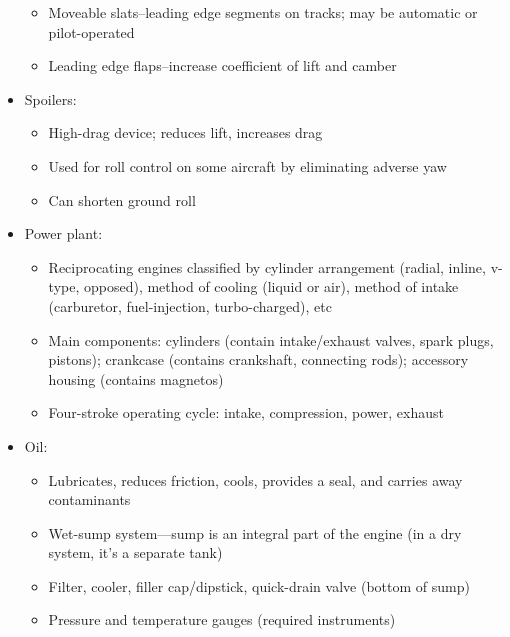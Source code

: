 \documentclass[twoside,openright]{report}
\begin{document}
\begin{itemize}
\begin{itemize}
      \item Moveable slats--leading edge segments on tracks; may be automatic or pilot-operated

      \item Leading edge flaps--increase coefficient of lift and camber
    \end{itemize}

  \item Spoilers:
    \begin{itemize}
      \item High-drag device; reduces lift, increases drag

      \item Used for roll control on some aircraft by eliminating adverse yaw

      \item Can shorten ground roll
    \end{itemize}

  \item Power plant:
    \begin{itemize}
        \item Reciprocating engines classified by cylinder arrangement (radial,
          inline, v-type, opposed), method of cooling (liquid or air), method
          of intake (carburetor, fuel-injection, turbo-charged), etc

        \item Main components: cylinders (contain intake/exhaust valves, spark
          plugs, pistons); crankcase (contains crankshaft, connecting rods);
          accessory housing (contains magnetos)

        \item Four-stroke operating cycle: intake, compression, power, exhaust
    \end{itemize}

  \item Oil:
    \begin{itemize}
      \item Lubricates, reduces friction, cools, provides a seal, and carries
        away contaminants

      \item Wet-sump system—sump is an integral part of the engine (in a dry
        system, it's a separate tank)

      \item Filter, cooler, filler cap/dipstick, quick-drain valve (bottom of
        sump)

      \item Pressure and temperature gauges (required instruments)
    \end{itemize}


\end{itemize}
\end{document}
